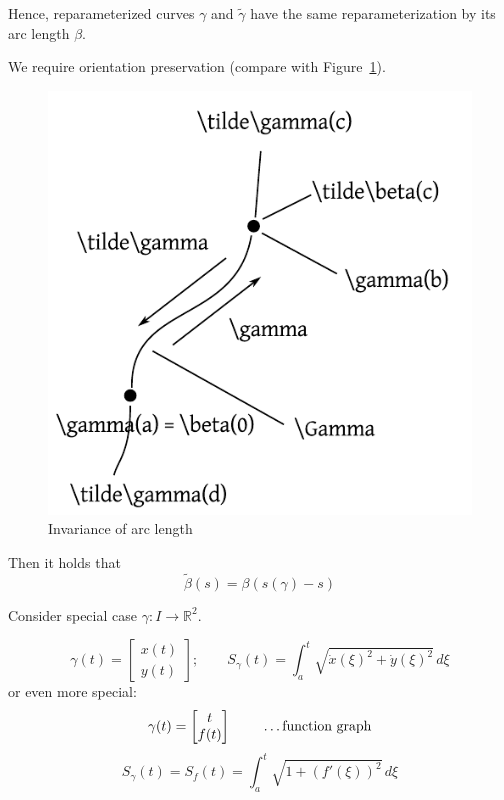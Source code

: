 \documentclass[a4paper,landscape,twocolumn]{article}
\theoremstyle{definition}
\begin{document}
Hence, reparameterized curves $\gamma$ and $\tilde{\gamma}$ have the same reparameterization by its arc length $\beta$.

We require orientation preservation (compare with Figure~\ref{img:arclength}).
%
\begin{figure}[!h]
  \begin{center}
    \includegraphics{img/arc_length_invariance.pdf}
    \caption{Invariance of arc length}
    \label{img:arclength}
  \end{center}
\end{figure}

Then it holds that
\[ \tilde{\beta}(s) = \beta(s(\gamma) - s) \]

Consider special case $\gamma: I \to \mathbb R^2$.

\[
  \gamma(t) = \begin{bmatrix} x(t) \\ y(t) \end{bmatrix};
  \qquad
  S_\gamma(t) = \int_a^t \sqrt{\dot{x}(\xi)^2 + \dot{y}(\xi)^2} \, d\xi
\]
or even more special:
\[ \gamma(t) = \begin{bmatrix} t \\ f(t) \end{bmatrix} \qquad \text{ \dots function graph} \]
\[ S_\gamma(t) = S_f(t) = \int_a^t \sqrt{1 + (f'(\xi))^2} \, d\xi \]
\end{document}
